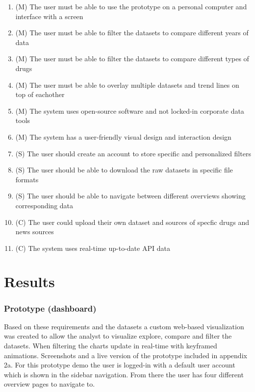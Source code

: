 \begin{enumerate}
  \item (M) The user must be able to use the prototype on a personal computer and interface with a screen
  \item (M) The user must be able to filter the datasets to compare different years of data
  \item (M) The user must be able to filter the datasets to compare different types of drugs
  \item (M) The user must be able to overlay multiple datasets and trend lines on top of eachother
  \item (M) The system uses open-source software and not locked-in corporate data tools
  \item (M) The system has a user-friendly visual design and interaction design
  \item (S) The user should create an account to store specific and personalized filters
  \item (S) The user should be able to download the raw datasets in specific file formats
  \item (S) The user should be able to navigate between different overviews showing corresponding data
  \item (C) The user could upload their own dataset and sources of specfic drugs and news sources
  \item (C) The system uses real-time up-to-date API data
\end{enumerate}

\section{Results}

\subsubsection {Prototype (dashboard)}\hfill

Based on these requirements and the datasets a custom web-based visualization was created to allow the analyst to visualize explore, compare and filter the datasets. When filtering the charts update in real-time with keyframed animations. Screenshots and a live version of the prototype included in appendix 2a. For this prototype demo the user is logged-in with a default user account which is shown in the sidebar navigation. From there the user has four different overview pages to navigate to. \newline


